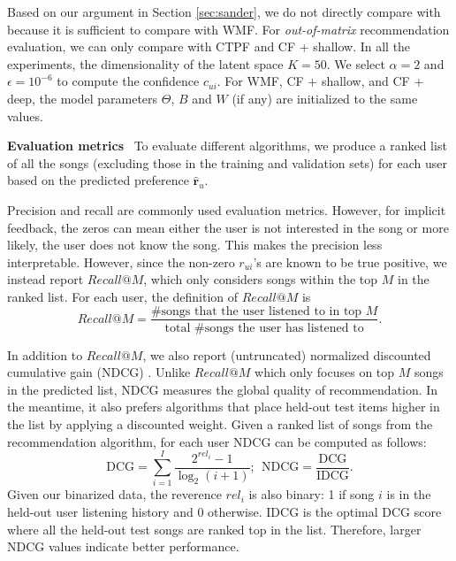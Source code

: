 Based on our argument in Section \ref{sec:sander}, we do not directly compare with \cite{van2013deep} because it is sufficient to compare with WMF. For \emph{out-of-matrix} recommendation evaluation, we can only compare with CTPF and CF + shallow. In all the experiments, the dimensionality of the latent space $K = 50$. We select $\alpha = 2$ and $\epsilon = 10^{-6}$ to compute the confidence $c_{ui}$. For WMF, CF + shallow, and CF + deep, the model parameters $\Theta$, $B$ and $W$ (if any) are initialized to the same values. 

\vspace{0.1in}
\noindent\textbf{Evaluation metrics}~
To evaluate different algorithms, we produce a ranked list of all the songs (excluding those in the training and validation sets) for each user based on the predicted preference $\hat{\boldsymbol{r}}_{u}$. 

Precision and recall are commonly used evaluation metrics. However, for implicit feedback, the zeros can mean either the user is not interested in the song or more likely, the user does not know the song. This makes the precision less interpretable. However, since the non-zero $r_{ui}$'s are known to be true positive, we instead report $Recall@M$, which only considers songs within the top $M$ in the ranked list. For each user, the definition of $Recall@M$ is
\[
Recall@M = \frac{\text{{\# songs that the user listened to in top $M$}}}{\text{{total \# songs the user has listened to}}}.
\]

In addition to $Recall@M$, we also report (untruncated) normalized discounted cumulative gain (NDCG) \cite{jarvelin2002cumulated}. Unlike $Recall@M$ which only focuses on top $M$ songs in the predicted list, NDCG measures the global quality of recommendation. In the meantime, it also prefers algorithms that place held-out test items higher in the list by applying a discounted weight.
Given a ranked list of songs from the recommendation algorithm, for each user NDCG can be computed as follows: 
\[
\text{DCG} = \sum_{i=1}^I \frac{2^{rel_i} - 1}{\log_2 (i + 1)}; ~~ \text{NDCG} = \frac{\text{DCG}}{\text{IDCG}}.
\]
Given our binarized data, the reverence $rel_i$ is also binary: 1 if song $i$ is in the held-out user listening history and 0 otherwise. IDCG is the optimal DCG score where all the held-out test songs are ranked top in the list. Therefore, larger NDCG values indicate better performance. 

